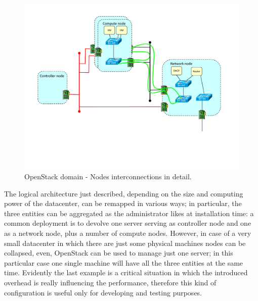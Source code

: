 \begin{figure}[h]
	\centering
	\includegraphics[clip= true, width= \columnwidth, trim=0cm 3cm 0cm 0cm]{images/os_cloud_with_br.pdf}
	\caption{OpenStack domain - Nodes interconnections in detail.}
	\label{fig:os_coud_with_br}
\end{figure}

The logical architecture just described, depending on the size and computing power of the datacenter, can be remapped in various ways; in particular, the three entities can be aggregated as the administrator likes at installation time: a common deployment is to devolve one server serving as controller node and one as a network node, plus a number of compute nodes. However, in case of a very small datacenter in which there are just some physical machines nodes can be collapsed, even, OpenStack can be used to manage just one server; in this particular case one single machine will have all the three entities at the same time. Evidently the last example is a critical situation in which the introduced overhead is really influencing the performance, therefore this kind of configuration is useful only for developing and testing purposes.

